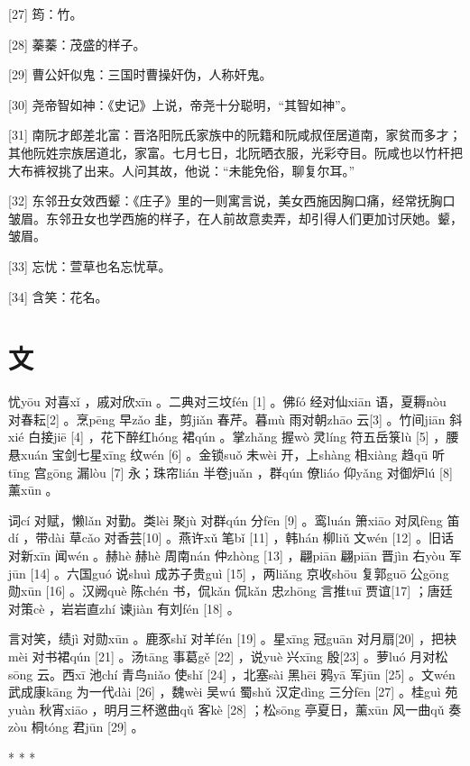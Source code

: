 \documentclass[12pt,UTF8]{ctexbook}
\begin{document}
[27] 筠：竹。

[28] 蓁蓁：茂盛的样子。

[29] 曹公奸似鬼：三国时曹操奸伪，人称奸鬼。

[30] 尧帝智如神：《史记》上说，帝尧十分聪明，“其智如神”。

[31] 南阮才郎差北富：晋洛阳阮氏家族中的阮籍和阮咸叔侄居道南，家贫而多才；其他阮姓宗族居道北，家富。七月七日，北阮晒衣服，光彩夺目。阮咸也以竹杆把大布裤衩挑了出来。人问其故，他说：“未能免俗，聊复尔耳。”

[32] 东邻丑女效西颦：《庄子》里的一则寓言说，美女西施因胸口痛，经常抚胸口皱眉。东邻丑女也学西施的样子，在人前故意卖弄，却引得人们更加讨厌她。颦，皱眉。

[33] 忘忧：萱草也名忘忧草。

[34] 含笑：花名。





\chapter{文}


忧yōu 对喜xǐ ，戚对欣xīn 。二典对三坟fén [1] 。佛fó 经对仙xiān 语，夏耨nòu 对春耘[2] 。烹pēng 早zǎo 韭，剪jiǎn 春芹。暮mù 雨对朝zhāo 云[3] 。竹间jiān 斜xié 白接jiē [4] ，花下醉红hóng 裙qún 。掌zhǎng 握wò 灵líng 符五岳箓lù [5] ，腰悬xuán 宝剑七星xīng 纹wén [6] 。金锁suǒ 未wèi 开，上shàng 相xiàng 趋qū 听tīng 宫gōng 漏lòu [7] 永；珠帘lián 半卷juǎn ，群qún 僚liáo 仰yǎng 对御炉lú [8] 薰xūn 。

词cí 对赋，懒lǎn 对勤。类lèi 聚jù 对群qún 分fēn [9] 。鸾luán 箫xiāo 对凤fèng 笛dí ，带dài 草cǎo 对香芸[10] 。燕许xǔ 笔bǐ [11] ，韩hán 柳liǔ 文wén [12] 。旧话对新xīn 闻wén 。赫hè 赫hè 周南nán 仲zhòng [13] ，翩piān 翩piān 晋jìn 右yòu 军jūn [14] 。六国guó 说shuì 成苏子贵guì [15] ，两liǎng 京收shōu 复郭guō 公gōng 勋xūn [16] 。汉阙què 陈chén 书，侃kǎn 侃kǎn 忠zhōng 言推tuī 贾谊[17] ；唐廷对策cè ，岩岩直zhí 谏jiàn 有刘fén [18] 。

言对笑，绩jì 对勋xūn 。鹿豕shǐ 对羊fén [19] 。星xīng 冠guān 对月扇[20] ，把袂mèi 对书裙qún [21] 。汤tāng 事葛gě [22] ，说yuè 兴xīng 殷[23] 。萝luó 月对松sōng 云。西xī 池chí 青鸟niǎo 使shǐ [24] ，北塞sài 黑hēi 鸦yā 军jūn [25] 。文wén 武成康kāng 为一代dài [26] ，魏wèi 吴wú 蜀shǔ 汉定dìng 三分fēn [27] 。桂guì 苑yuàn 秋宵xiāo ，明月三杯邀曲qǔ 客kè [28] ；松sōng 亭夏日，薰xūn 风一曲qǔ 奏zòu 桐tóng 君jūn [29] 。



* * *
\end{document}
